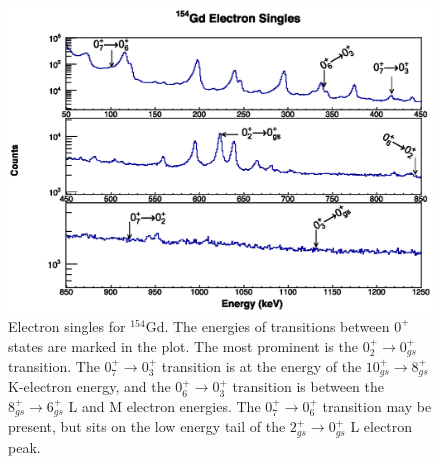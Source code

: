 \begin{figure}
    \centering
    \includegraphics[scale=0.8]{154GdTablesAndFigs/154Gd_Singles_Electron_Label.eps}
    \caption{Electron singles for $^{154}$Gd. The energies of transitions between $0^+$ states are marked in the plot. The most prominent is the $0^+_{2}\rightarrow0^+_{gs}$ transition. The $0^+_{7}\rightarrow0^+_{3}$ transition is at the energy of the $10^+_{gs}\rightarrow8^+_{gs}$ K-electron energy, and the $0^+_{6}\rightarrow0^+_{3}$ transition is between the $8^+_{gs}\rightarrow6^+_{gs}$ L and M electron energies. The $0^+_{7}\rightarrow0^+_{6}$ transition may be present, but sits on the low energy tail of the $2^+_{gs}\rightarrow0^+_{gs}$ L electron peak.}
    \label{fig:154_e_singles}
\end{figure}